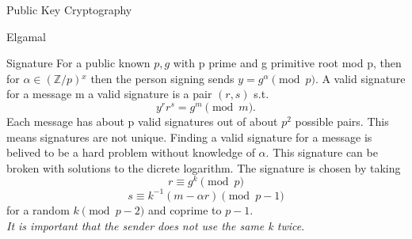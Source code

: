 \documentclass[12pt, letterpaper]{article}
\begin{document}
\begin{section}{Public Key Cryptography}
\begin{subsection}{Elgamal}
\begin{subsubsection}{Signature}
      For a public known \(p, g\) with p prime and g primitive root mod p, then
      for \(\alpha \in (\mathbb{Z} / p){}^{x}\) then the person signing sends
      \(y = g^{\alpha} \pmod{p}\). A valid signature for a message m a valid
      signature is a pair \((r, s)\) s.t.\ \[y^{r}r^{s} = g^{m} \pmod{m}.\]
      Each message has about p valid signatures out of about \(p^{2}\) possible
      pairs. This means signatures are not unique. Finding a valid signature
      for a message is belived to be a hard problem without knowledge of
      \(\alpha\). This signature can be broken with solutions to the dicrete
      logarithm. The signature is chosen by taking \[r \equiv g^{k} \pmod{p}\]
      \[s \equiv k^{-1}(m - \alpha r) \pmod{p - 1}\] for a random
      \(k \pmod{p - 2}\) and coprime to \(p - 1\). \\
      \textit{It is important that the sender does not use the same k twice}.

    \end{subsubsection}

  \end{subsection}

\end{section}
\end{document}
